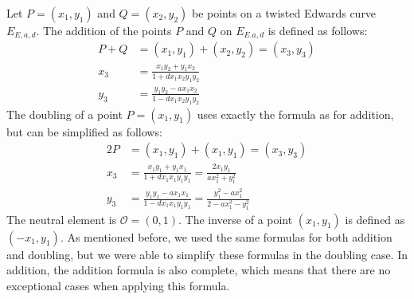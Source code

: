 Let $P=(x_1, y_1)$ and $Q=(x_2, y_2)$ be points on a twisted Edwards curve $E_{E,a,d}$.
The addition of the points $P$ and $Q$ on $E_{E.a,d}$ is defined as follows:
%
\begin{align*}
P + Q &= (x_1, y_1) + (x_2, y_2) = (x_3, y_3) \\
x_3 &= \frac{x_1 y_2 + y_1 x_2}{1 + d x_1 x_2 y_1 y_2} \\
y_3 &= \frac{y_1 y_2 - a x_1 x_2}{1 - d x_1 x_2 y_1 y_2}
\end{align*}
%
The doubling of a point $P=(x_1, y_1)$ uses exactly the formula as for addition, but can be simplified as follows:
%
\begin{align*}
2P &= (x_1, y_1) + (x_1, y_1) = (x_3, y_3) \\
x_3 &= \frac{x_1 y_1 + y_1 x_1}{1 + d x_1 x_1 y_1 y_1} = \frac{2 x_1 y_1}{ax_1^2 + y_1^2} \\
y_3 &= \frac{y_1 y_1 - a x_1 x_1}{1 - d x_1 x_1 y_1 y_1} = \frac{y_1^2 - ax_1^2}{2 - ax_1^2 - y_1^2}
\end{align*}
%
The neutral element is $\mathcal{O} = (0, 1)$.
The inverse of a point $(x_1, y_1)$ is defined as $(-x_1, y_1)$.
As mentioned before, we used the same formulas for both addition and doubling, but we were able to simplify these formulas in the doubling case.
In addition, the addition formula is also complete, which means that there are no exceptional cases when applying this formula.